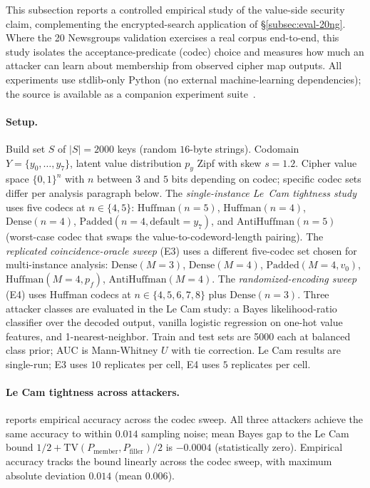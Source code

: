 \documentclass[11pt]{article}
\theoremstyle{definition}
\theoremstyle{plain}
\theoremstyle{remark}
\begin{document}
This subsection reports a controlled empirical study of the value-side
security claim, complementing the encrypted-search application of
\S\ref{subsec:eval-20ng}.  Where the 20 Newsgroups validation
exercises a real corpus end-to-end, this study isolates the
acceptance-predicate (codec) choice and measures how much an attacker
can learn about membership from observed cipher map outputs.  All
experiments use stdlib-only Python (no external machine-learning
dependencies); the source is available as a companion experiment
suite~\cite{towell2026codec}.

\paragraph{Setup.}
Build set $S$ of $|S| = 2000$ keys (random $16$-byte strings).
Codomain $Y = \{y_0, \ldots, y_7\}$, latent value distribution $p_y$
Zipf with skew $s = 1.2$.  Cipher value space $\{0,1\}^n$ with $n$
between $3$ and $5$ bits depending on codec; specific codec sets
differ per analysis paragraph below.  The \emph{single-instance
Le~Cam tightness study} uses five codecs at $n \in \{4, 5\}$:
$\mathrm{Huffman}(n{=}5)$, $\mathrm{Huffman}(n{=}4)$,
$\mathrm{Dense}(n{=}4)$, $\mathrm{Padded}(n{=}4, \text{default}{=}y_7)$,
and $\mathrm{AntiHuffman}(n{=}5)$ (worst-case codec that swaps the
value-to-codeword-length pairing).  The \emph{replicated coincidence-oracle
sweep} (E3) uses a different five-codec set chosen for multi-instance
analysis: $\mathrm{Dense}(M{=}3)$, $\mathrm{Dense}(M{=}4)$,
$\mathrm{Padded}(M{=}4, v_0)$, $\mathrm{Huffman}(M{=}4, p_f)$,
$\mathrm{AntiHuffman}(M{=}4)$.  The \emph{randomized-encoding sweep}
(E4) uses Huffman codecs at $n \in \{4, 5, 6, 7, 8\}$ plus
$\mathrm{Dense}(n{=}3)$.  Three attacker classes are evaluated in the
Le Cam study: a Bayes likelihood-ratio classifier over the decoded
output, vanilla logistic regression on one-hot value features, and
1-nearest-neighbor.  Train and test sets are 5000 each at balanced
class prior; AUC is Mann-Whitney $U$ with tie correction.  Le Cam
results are single-run; E3 uses $10$ replicates per cell, E4 uses
$5$ replicates per cell.

\paragraph{Le Cam tightness across attackers.}
 reports empirical accuracy across the codec
sweep.  All three attackers achieve the same accuracy to within $0.014$
sampling noise; mean Bayes gap to the Le Cam bound
$1/2 + \mathrm{TV}(P_{\mathrm{member}}, P_{\mathrm{filler}})/2$ is
$-0.0004$ (statistically zero).  Empirical accuracy tracks the bound
linearly across the codec sweep, with maximum absolute deviation
$0.014$ (mean $0.006$).
\end{document}
